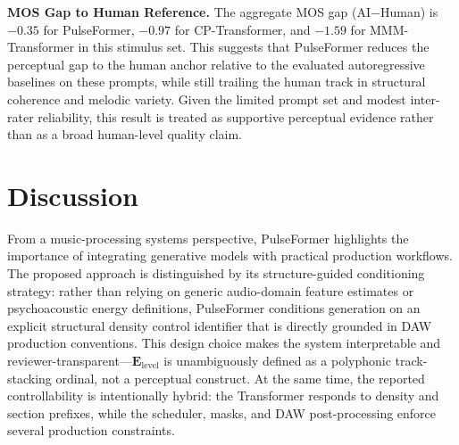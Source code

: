\documentclass[pdflatex,sn-mathphys-num,twocolumn]{sn-jnl}
\theoremstyle{thmstyleone}
\theoremstyle{thmstyletwo}
\begin{document}
\textbf{MOS Gap to Human Reference.} The aggregate MOS gap (AI$-$Human) is $-0.35$ for PulseFormer, $-0.97$ for CP-Transformer, and $-1.59$ for MMM-Transformer in this stimulus set. This suggests that PulseFormer reduces the perceptual gap to the human anchor relative to the evaluated autoregressive baselines on these prompts, while still trailing the human track in structural coherence and melodic variety. Given the limited prompt set and modest inter-rater reliability, this result is treated as supportive perceptual evidence rather than as a broad human-level quality claim.


\section{Discussion}
\label{sec:discussion}
From a music-processing systems perspective, PulseFormer highlights the importance of integrating generative models with practical production workflows. The proposed approach is distinguished by its structure-guided conditioning strategy: rather than relying on generic audio-domain feature estimates or psychoacoustic energy definitions, PulseFormer conditions generation on an explicit structural density control identifier that is directly grounded in DAW production conventions. This design choice makes the system interpretable and reviewer-transparent---$\mathbf{E}_{\mathrm{level}}$ is unambiguously defined as a polyphonic track-stacking ordinal, not a perceptual construct. At the same time, the reported controllability is intentionally hybrid: the Transformer responds to density and section prefixes, while the scheduler, masks, and DAW post-processing enforce several production constraints.
\end{document}
